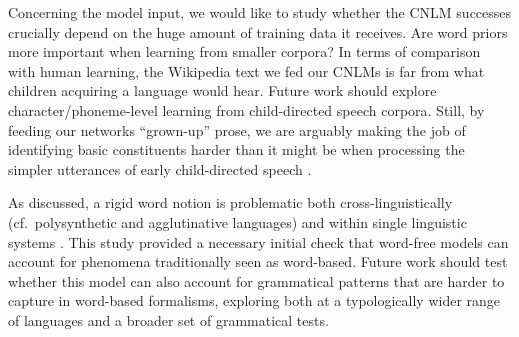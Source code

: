 Concerning the model input, we would like to study whether the
CNLM successes crucially depend on the huge amount
of training data it receives.  Are word priors more important when
learning from smaller corpora? In terms of comparison with human
learning, the Wikipedia text we fed our CNLMs is far from
what children acquiring a language would hear. Future work should
explore character/phoneme-level learning from child-directed speech
corpora. Still, by feeding our networks ``grown-up'' prose, we are
arguably making the job of identifying basic constituents harder than
it might be when processing the simpler utterances of early
child-directed speech \cite{Tomasello:2003}.

As discussed, a rigid word notion is problematic both
cross-linguistically (cf.~polysynthetic and agglutinative languages)
and within single linguistic systems \cite[cf.~the view that
the lexicon hosts units at different levels of the linguistic
hierarchy, from morphemes to large syntactic constructions,
e.g.,][]{Jackendoff:1997,Croft:Cruse:2004,Goldberg:2005}. This study provided a necessary initial check
that word-free models can account for phenomena traditionally
seen as word-based. Future work should test whether this
model can also account for grammatical patterns that are harder to
capture in word-based formalisms, exploring both at a typologically
wider range of languages and a broader set of grammatical tests.



